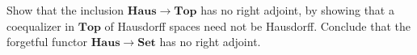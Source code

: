 Show that the inclusion $\mathbf{Haus} \to \mathbf{Top}$ has no right adjoint, by showing that a coequalizer in $\mathbf{Top}$ of Hausdorff spaces need not be Hausdorff. Conclude that the forgetful functor $\mathbf{Haus} \to \mathbf{Set}$ has no right adjoint.
